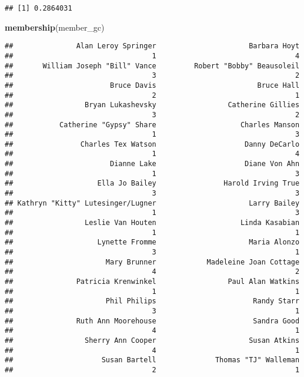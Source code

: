 \documentclass[
]{article}
\newenvironment{Shaded}{\begin{snugshade}}{\end{snugshade}}
\newcommand{\KeywordTok}[1]{\textcolor[rgb]{0.13,0.29,0.53}{\textbf{#1}}}
\newcommand{\NormalTok}[1]{#1}
\begin{document}
\begin{verbatim}
## [1] 0.2864031
\end{verbatim}

\begin{Shaded}
\begin{Highlighting}[]
\KeywordTok{membership}\NormalTok{(member_gc)}
\end{Highlighting}
\end{Shaded}

\begin{verbatim}
##               Alan Leroy Springer                      Barbara Hoyt 
##                                 1                                 4 
##       William Joseph "Bill" Vance         Robert "Bobby" Beausoleil 
##                                 3                                 2 
##                       Bruce Davis                        Bruce Hall 
##                                 2                                 1 
##                 Bryan Lukashevsky                 Catherine Gillies 
##                                 3                                 2 
##           Catherine "Gypsy" Share                    Charles Manson 
##                                 1                                 3 
##                Charles Tex Watson                     Danny DeCarlo 
##                                 1                                 4 
##                       Dianne Lake                     Diane Von Ahn 
##                                 1                                 3 
##                    Ella Jo Bailey                Harold Irving True 
##                                 3                                 3 
## Kathryn "Kitty" Lutesinger/Lugner                      Larry Bailey 
##                                 1                                 3 
##                 Leslie Van Houten                    Linda Kasabian 
##                                 1                                 1 
##                    Lynette Fromme                      Maria Alonzo 
##                                 3                                 1 
##                      Mary Brunner            Madeleine Joan Cottage 
##                                 4                                 2 
##               Patricia Krenwinkel                 Paul Alan Watkins 
##                                 1                                 1 
##                      Phil Philips                       Randy Starr 
##                                 3                                 1 
##               Ruth Ann Moorehouse                       Sandra Good 
##                                 4                                 1 
##                 Sherry Ann Cooper                      Susan Atkins 
##                                 4                                 1 
##                     Susan Bartell              Thomas "TJ" Walleman 
##                                 2                                 1
\end{verbatim}
\end{document}
